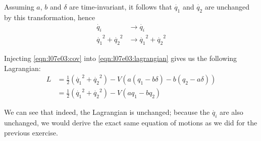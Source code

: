 \documentclass[solutions.tex]{subfiles}
\begin{document}
Assuming $a$, $b$ and $\delta$ are time-invariant, it follows that
$\dot{q_1}$ and $\dot{q_2}$ are unchanged by this transformation, hence
\begin{align*}
	\dot{q_i} &\rightarrow \dot{q_i}\\
	\dot{q_1}^2+\dot{q_2}^2 &\rightarrow \dot{q_1}^2+\dot{q_2}^2
\end{align*}

Injecting \eqref{eqn:l07e03:cov} into \eqref{eqn:l07e03:lagrangian} gives
us the following Lagrangian:
\begin{align*}
	L &= \frac{1}{2}(\dot{q_1}^2+\dot{q_2}^2)
		- V(a(q_1-b\delta) - b(q_2-a\delta))\\
	~ &= \frac{1}{2}(
		\dot{q_1}^2+\dot{q_2}^2
	) - V(a q_1 - b q_2)
\end{align*}

We can see that indeed, the Lagrangian is unchanged; because the
$\dot{q_i}$ are also unchanged, we would derive the exact
same equation of motions as we did for the previous exercise.
\end{document}
